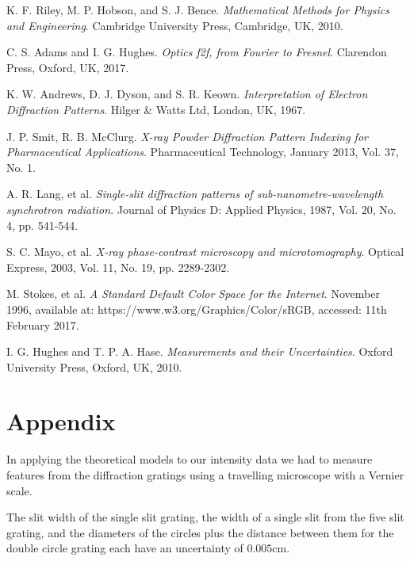 \documentclass[twocolumn]{revtex4}
\begin{document}
\begin{thebibliography}{5}
	K. F. Riley, M. P. Hobson, and S. J. Bence.
	\textit{Mathematical Methods for Physics and Engineering}.
	Cambridge University Press, Cambridge, UK, 2010.
	
	C. S. Adams and I. G. Hughes.
	\textit{Optics f2f, from Fourier to Fresnel}.
	Clarendon Press, Oxford, UK, 2017.

	K. W. Andrews, D. J. Dyson, and S. R. Keown.
	\textit{Interpretation of Electron Diffraction Patterns}.
	Hilger \& Watts Ltd, London, UK, 1967.
	
	J. P. Smit, R. B. McClurg.	
	\textit{X-ray Powder Diffraction Pattern Indexing for Pharmaceutical Applications}.
	Pharmaceutical Technology, January 2013, Vol. 37, No. 1.
	
	A. R. Lang, et al.
	\textit{Single-slit diffraction patterns of sub-nanometre-wavelength synchrotron radiation}.
	Journal of Physics D: Applied Physics, 1987, Vol. 20, No. 4, pp. 541-544.
	
	S. C. Mayo, et al.
	\textit{X-ray phase-contrast microscopy and microtomography}.
	Optical Express, 2003, Vol. 11, No. 19, pp. 2289-2302.
	
	M. Stokes, et al.
	\textit{A Standard Default Color Space for the Internet}.
	November 1996, available at: https://www.w3.org/Graphics/Color/sRGB, accessed: 11th February 2017. 
	
	I. G. Hughes and T. P. A. Hase.
	\textit{Measurements and their Uncertainties}. 
	Oxford University Press, Oxford, UK, 2010.
	
\end{thebibliography}
\clearpage

\vfill
\twocolumngrid
\vspace{-3ex}
\section*{Appendix}
\vspace{-2ex}

In applying the theoretical models to our intensity data we had to measure features from the diffraction gratings using a travelling microscope with a Vernier scale. 

The slit width of the single slit grating, the width of a single slit from the five slit grating, and the diameters of the circles plus the distance between them for the double circle grating each have an uncertainty of $0.005$cm.
\end{document}
